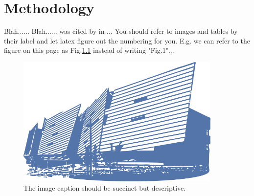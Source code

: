 \chapter{Methodology}
Blah......
Blah...... was cited by \cite{zasloff2002antimicrobial} in ... You should refer to images and tables by their label and let latex figure out the numbering for you. E.g. we can refer to the figure on this page as Fig.\ref{image:myImageName} instead of writing "Fig.1"...




\begin{figure}[h!]
	\caption{The image caption should be succinct but descriptive.}
	\label{image:myImageName}
	\centering
	\includegraphics[width=0.9\textwidth]{gmit-building}
\end{figure}	